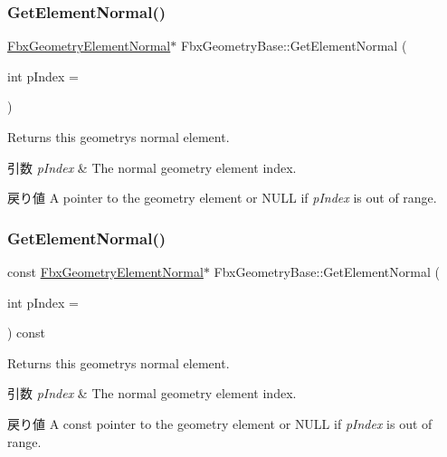 \subsubsection{\texorpdfstring{Get\+Element\+Normal()}{GetElementNormal()}\hspace{0.1cm}{\footnotesize\ttfamily [1/2]}}
{\footnotesize\ttfamily \hyperlink{fbxlayer_8h_a54a5aaec6f1979871fe9d93dd2d246c9}{Fbx\+Geometry\+Element\+Normal}$\ast$ Fbx\+Geometry\+Base\+::\+Get\+Element\+Normal (\begin{DoxyParamCaption}\item[{int}]{p\+Index = {} }\end{DoxyParamCaption})}

Returns this geometry\textquotesingle{}s normal element. 
\begin{DoxyParams}{引数}
{\em p\+Index} & The normal geometry element index. \\
\hline
\end{DoxyParams}
\begin{DoxyReturn}{戻り値}
A pointer to the geometry element or {\ttfamily N\+U\+LL} if {\itshape p\+Index} is out of range. 
\end{DoxyReturn}
\mbox{\label{class_fbx_geometry_base_a33d41a1c8b2346aa73a2576225387fb4}} 
\subsubsection{\texorpdfstring{Get\+Element\+Normal()}{GetElementNormal()}\hspace{0.1cm}{\footnotesize\ttfamily [2/2]}}
{\footnotesize\ttfamily const \hyperlink{fbxlayer_8h_a54a5aaec6f1979871fe9d93dd2d246c9}{Fbx\+Geometry\+Element\+Normal}$\ast$ Fbx\+Geometry\+Base\+::\+Get\+Element\+Normal (\begin{DoxyParamCaption}\item[{int}]{p\+Index = {} }\end{DoxyParamCaption}) const}

Returns this geometry\textquotesingle{}s normal element. 
\begin{DoxyParams}{引数}
{\em p\+Index} & The normal geometry element index. \\
\hline
\end{DoxyParams}
\begin{DoxyReturn}{戻り値}
A const pointer to the geometry element or {\ttfamily N\+U\+LL} if {\itshape p\+Index} is out of range. 
\end{DoxyReturn}
\mbox{\label{class_fbx_geometry_base_ae8cffdf94daa997de808328579c636c2}} 
